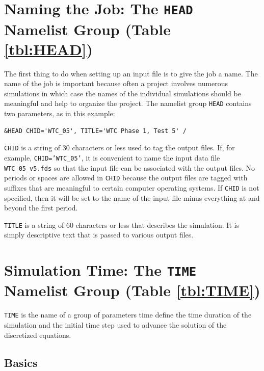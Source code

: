 \documentclass[11pt]{book}
\newcommand{\ct}{\tt\small}
\begin{document}
\section{Naming the Job: The \texorpdfstring{{\tt HEAD}}{HEAD} Namelist Group (Table \ref{tbl:HEAD})}
\label{info:HEAD}

The first thing to do when setting up an input file is to give the
job a name.  The name of the job is important because often a project
involves numerous simulations in which case the names of the individual
simulations should be meaningful and help to organize the project.  The namelist group {\ct HEAD} contains
two parameters, as in this example:

\footnotesize
\begin{verbatim}
&HEAD CHID='WTC_05', TITLE='WTC Phase 1, Test 5' /
\end{verbatim}
\normalsize

\begin{description}
\item {\ct CHID} is a string of 30 characters or less used to tag the output files.
If, for example, {\ct CHID='WTC\_05'}, it is convenient to
name the input data file {\ct WTC\_05\_v5.fds} so that the input file
can be associated with the output files. No periods or spaces are allowed in
{\ct CHID} because the output files are tagged with suffixes that
are meaningful to certain computer operating systems.  If {\ct CHID} is not
specified, then it will be set to the name of the input file minus everything at and beyond the first period.
\item {\ct TITLE} is a string of 60 characters or less that describes the
simulation. It is simply descriptive text that is passed to various output files.
\end{description}


\section{Simulation Time: The \texorpdfstring{{\tt TIME}}{TIME} Namelist Group (Table \ref{tbl:TIME})}
\label{info:TIME}

{\ct TIME} is the name of a group of parameters time define the time
duration of the simulation and the initial time step used to advance
the solution of the discretized equations.

\subsection{Basics}
\label{info:TIME_Basics}
\end{document}
